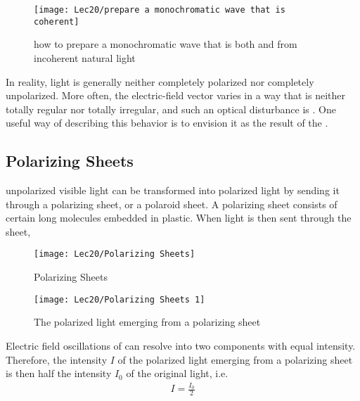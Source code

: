 \begin{figure}[H]
    \centering
    \texttt{[image: Lec20/prepare a monochromatic wave that is coherent]}
    \caption{how to prepare a monochromatic wave that is both  and  from incoherent natural light}
\end{figure}

In reality, light is generally neither completely polarized nor completely unpolarized. More often, the electric-field vector varies in a way that is neither totally regular nor totally irregular, and such an optical disturbance is . One useful way of describing this behavior is to envision it as the result of the . 

\subsection{Polarizing Sheets}
unpolarized visible light can be transformed into polarized light by sending it through a polarizing sheet, or a polaroid sheet. A polarizing sheet consists of certain long molecules embedded in plastic. When light is then sent through the sheet, 

\begin{figure}[H]
    \centering
    \begin{minipage}{0.22\textwidth}
        \centering
        \texttt{[image: Lec20/Polarizing Sheets]}
        \caption{\tiny Polarizing Sheets}
    \end{minipage}
    \begin{minipage}{0.18\textwidth}
        \centering
        \texttt{[image: Lec20/Polarizing Sheets 1]}
        \caption{\small The polarized light emerging from a polarizing sheet}
    \end{minipage}
\end{figure}

Electric field oscillations of  can resolve into two components with equal intensity. Therefore, the intensity $I$ of the polarized light emerging from a polarizing sheet is then half the intensity $I_0$ of the original light, i.e.
\begin{align*}
    I=\frac{I_0}{2}
\end{align*}

